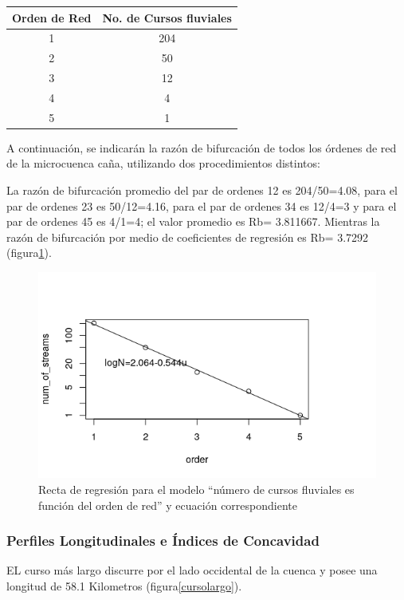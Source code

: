\documentclass[11pt,]{article}
\begin{document}
\begin{longtable}[]{@{}cc@{}}
\toprule
Orden de Red & No. de Cursos fluviales\tabularnewline
\midrule
\endhead
1 & 204\tabularnewline
2 & 50\tabularnewline
3 & 12\tabularnewline
4 & 4\tabularnewline
5 & 1\tabularnewline
\bottomrule
\end{longtable}

A continuación, se indicarán la razón de bifurcación de todos los
órdenes de red de la microcuenca caña, utilizando dos procedimientos
distintos:

La razón de bifurcación promedio del par de ordenes 1\textbar{}2 es
204/50=4.08, para el par de ordenes 2\textbar{}3 es 50/12=4.16, para el
par de ordenes 3\textbar{}4 es 12/4=3 y para el par de ordenes
4\textbar{}5 es 4/1=4; el valor promedio es Rb= 3.811667. Mientras la
razón de bifurcación por medio de coeficientes de regresión es Rb=
3.7292 (figura\ref{razonbifurcacion}).

\begin{figure}
\centering
\includegraphics{razon_de_bifurcacion.png}
\caption{Recta de regresión para el modelo ``número de cursos fluviales
es función del orden de red'' y ecuación
correspondiente\label{razonbifurcacion}}
\end{figure}

\subsubsection{Perfiles Longitudinales e Índices de
Concavidad}\label{perfiles-longitudinales-e-uxedndices-de-concavidad}

EL curso más largo discurre por el lado occidental de la cuenca y posee
una longitud de 58.1 Kilometros (figura\ref{cursolargo}).
\end{document}

